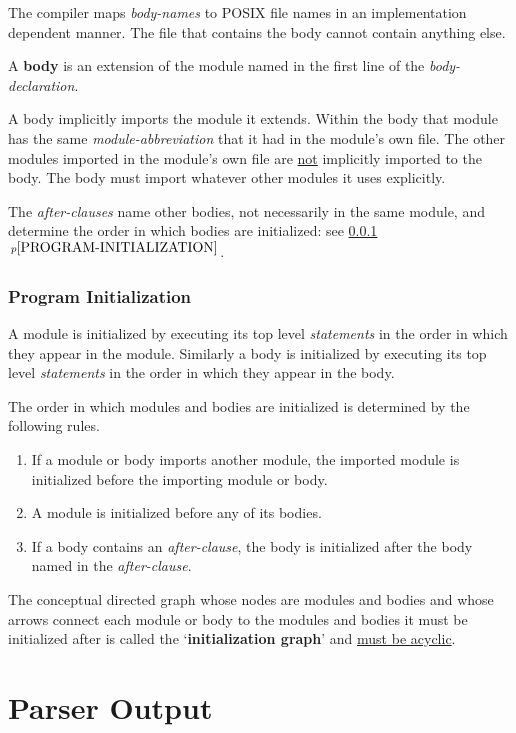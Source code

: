 \documentclass[12pt]{article}
\newcommand{\key}[1]{{\rm \bfseries #1}}
\newcommand{\itemref}[1]{\ref{#1}$\,^{p\pageref{#1}}$}
\begin{document}
The compiler maps {\em body-names} to POSIX file names in an
implementation dependent manner.  The file that contains the
body cannot contain anything else.

A \key{body} is an extension of the module named in the first
line of the {\em body-declaration}.

A body implicitly imports the module it extends.  Within the
body that module has the same {\em module-abbreviation} that it
had in the module's own file.  The other modules imported in the
module's own file are \underline{not} implicitly imported
to the body.  The body must import whatever other modules it uses
explicitly.

The {\em after-clauses} name other bodies, not necessarily in
the same module,
and determine the order in which bodies are initialized:
see \itemref{PROGRAM-INITIALIZATION}.

\subsubsection{Program Initialization}
\label{PROGRAM-INITIALIZATION}

A module is initialized by executing its top level {\em statements}
in the order in which they appear in the module.  Similarly
a body is initialized by executing its top level {\em statements}
in the order in which they appear in the body.

The order in which modules and bodies are initialized is determined
by the following rules.
\begin{enumerate}
\item If a module or body imports another module, the imported module
is initialized before the importing module or body.
\item A module is initialized before any of its bodies.
\item If a body contains an {\em after-clause}, the body
is initialized after the body named in the {\em after-clause}.
\end{enumerate}

The conceptual directed graph whose nodes are modules and bodies
and whose arrows connect each module or body to the modules and
bodies it must be initialized after is called
the `\key{initialization graph}'\label{INITIALIZATION-GRAPH}
and \underline{must be acyclic}.

\section{Parser Output}
\label{PARSER-OUTPUT}
\end{document}
